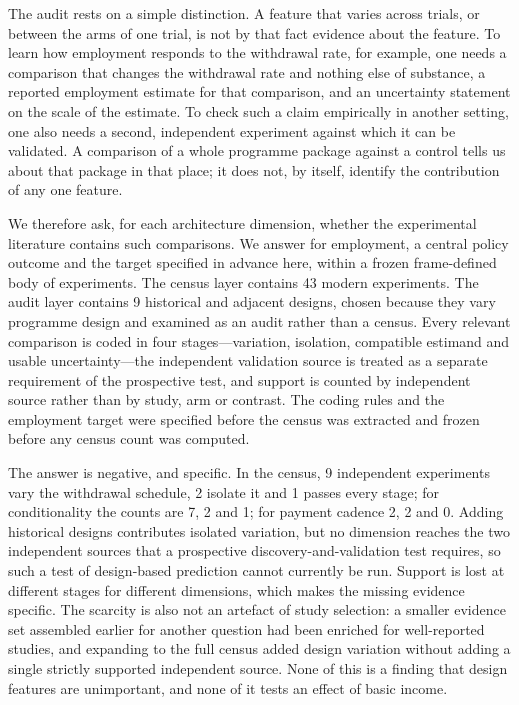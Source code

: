 \documentclass[11pt]{article}
\begin{document}
The audit rests on a simple distinction. A feature that varies across trials, or between the arms of one trial, is not by that fact evidence about the feature. To learn how employment responds to the withdrawal rate, for example, one needs a comparison that changes the withdrawal rate and nothing else of substance, a reported employment estimate for that comparison, and an uncertainty statement on the scale of the estimate. To check such a claim empirically in another setting, one also needs a second, independent experiment against which it can be validated. A comparison of a whole programme package against a control tells us about that package in that place; it does not, by itself, identify the contribution of any one feature.

We therefore ask, for each architecture dimension, whether the experimental literature contains such comparisons. We answer for employment, a central policy outcome and the target specified in advance here, within a frozen frame-defined body of experiments. The census layer contains 43 modern experiments. %
The audit layer contains 9 historical and adjacent designs, chosen because they vary programme design and examined as an audit rather than a census. %
Every relevant comparison is coded in four stages---variation, isolation, compatible estimand and usable uncertainty---the independent validation source is treated as a separate requirement of the prospective test, and support is counted by independent source rather than by study, arm or contrast. The coding rules and the employment target were specified before the census was extracted and frozen before any census count was computed.

The answer is negative, and specific. In the census, 9 independent experiments vary the withdrawal schedule, 2 isolate it and 1 passes every stage; for conditionality the counts are 7, 2 and 1; for payment cadence 2, 2 and 0. %
Adding historical designs contributes isolated variation, but no dimension reaches the two independent sources that a prospective discovery-and-validation test requires, so such a test of design-based prediction cannot currently be run. Support is lost at different stages for different dimensions, which makes the missing evidence specific. The scarcity is also not an artefact of study selection: a smaller evidence set assembled earlier for another question had been enriched for well-reported studies, and expanding to the full census added design variation without adding a single strictly supported independent source. None of this is a finding that design features are unimportant, and none of it tests an effect of basic income.
\end{document}
